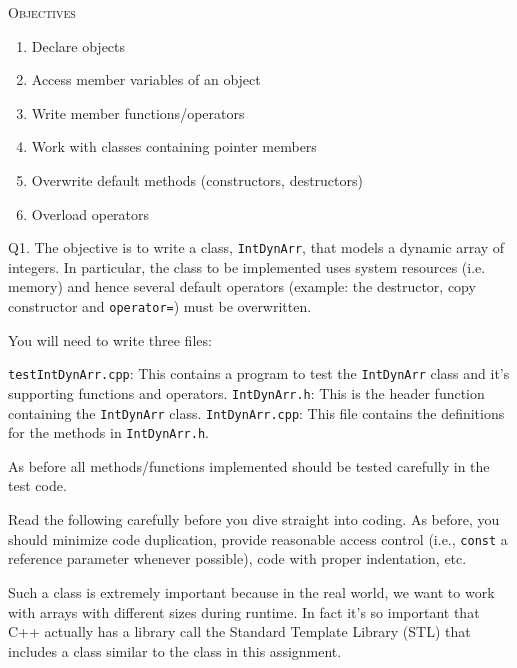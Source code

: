 



\renewcommand\TITLE{Assignment 10}


\topmatter

\textsc{Objectives}
    \begin{enumerate}[nosep]
    \item Declare objects
    \item Access member variables of an object
    \item Write member functions/operators
    \item Work with classes containing pointer members
    \item Overwrite default methods (constructors, destructors)
    \item Overload operators
    \end{enumerate}

\newpage

Q1. The objective is to write a class, \verb!IntDynArr!, that 
models a dynamic array of integers. In particular, the class to 
be implemented uses system resources (i.e. memory) and hence several
default operators (example: the destructor, copy constructor and
\verb!operator=!) 
must be overwritten. 

You will need to write three files:
\begin{tightlist}
\li \verb!testIntDynArr.cpp!: This contains a program to test the \verb!IntDynArr! class 
and it's supporting functions and operators.
\li \verb!IntDynArr.h!: This is the header function containing the \verb!IntDynArr! class.
\li \verb!IntDynArr.cpp!: This file contains the definitions for the methods in 
\verb!IntDynArr.h!.
\end{tightlist}

As before all methods/functions implemented should be tested carefully in the 
test code. 

Read the following carefully before you dive straight into coding. As before, 
you should minimize code duplication, provide reasonable access control 
(i.e., \verb!const! a reference parameter whenever possible), code with proper 
indentation, etc. 

Such a class is extremely important because in the real world, we want to 
work with arrays with different sizes during runtime. In fact it's so important 
that C++ actually has a library call the Standard Template Library (STL) that 
includes a class similar to the class in this assignment. 


